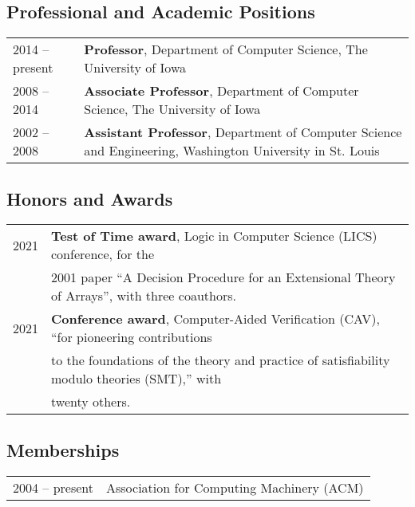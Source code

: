 \documentclass[10pt]{article}
\begin{document}
\subsection*{Professional and Academic Positions}
\smallskip

\quad
\begin{tabular}{l@{\quad\ }p{35em}}
 2014 -- present
 & {\bf Professor}, Department of Computer Science, 
   The University of Iowa
 \\[3.5ex]
 2008 -- 2014
 & {\bf Associate Professor}, Department of Computer Science, 
   The University of Iowa
 \\[3.5ex]
 2002 -- 2008
 & {\bf Assistant Professor}, Department of Computer Science and Engineering, 
   Washington University in St. Louis
 \\[3.5ex]
\end{tabular}



\subsection*{Honors and Awards}
\smallskip

\quad
{
\begin{tabular}{l@{\quad\ }l}
 2021
 & {\bf Test of Time award}, Logic in Computer Science (LICS) conference, for the \\
 \ & 2001 paper ``A Decision Procedure for an Extensional Theory of Arrays'', with three coauthors.
 \\[.5ex]
 2021
 & {\bf Conference award}, Computer-Aided Verification (CAV), ``for pioneering contributions \\
 \ & to the foundations of the theory and practice of satisfiability modulo theories (SMT),'' with \\
 \ & twenty others.
 \\[.5ex]
\end{tabular}
}

\subsection*{Memberships}
\smallskip

\quad
\begin{tabular}{l@{\quad\ }l}
 2004 -- present
 & Association for Computing Machinery (ACM)
 \\[.5ex]
\end{tabular}
\end{document}
